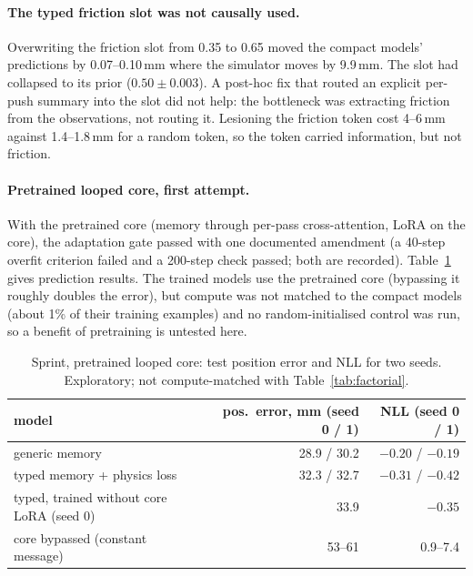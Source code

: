 \paragraph{The typed friction slot was not causally used.} Overwriting the friction slot from 0.35 to 0.65
moved the compact models' predictions by 0.07--0.10\,mm where the simulator moves by 9.9\,mm. The slot had
collapsed to its prior ($0.50 \pm 0.003$). A post-hoc fix that routed an explicit per-push summary into the slot
did not help: the bottleneck was extracting friction from the observations, not routing it. Lesioning the
friction token cost 4--6\,mm against 1.4--1.8\,mm for a random token, so the token carried information, but
not friction.

\paragraph{Pretrained looped core, first attempt.} With the pretrained \inkling{} core (memory through
per-pass cross-attention, LoRA on the core), the adaptation gate passed with one documented amendment (a
40-step overfit criterion failed and a 200-step check passed; both are recorded). Table~\ref{tab:inkling-v1}
gives prediction results. The trained models use the pretrained core (bypassing it roughly doubles the error),
but compute was not matched to the compact models (about 1\% of their training examples) and no random-initialised
control was run, so a benefit of pretraining is untested here.

\begin{table}[!htbp]
  \centering\small
  \caption{Sprint, pretrained looped core: test position error and NLL for two seeds. Exploratory;
  not compute-matched with Table~\ref{tab:factorial}.}
  \label{tab:inkling-v1}
  \begin{tabular}{@{}lrr@{}}
    \toprule
    model & pos.\ error, mm (seed 0 / 1) & NLL (seed 0 / 1) \\
    \midrule
    generic memory                          & 28.9 / 30.2 & $-0.20$ / $-0.19$ \\
    typed memory + physics loss             & 32.3 / 32.7 & $-0.31$ / $-0.42$ \\
    typed, trained without core LoRA (seed 0) & 33.9 & $-0.35$ \\
    core bypassed (constant message)        & 53--61 & 0.9--7.4 \\
    \bottomrule
  \end{tabular}
\end{table}

